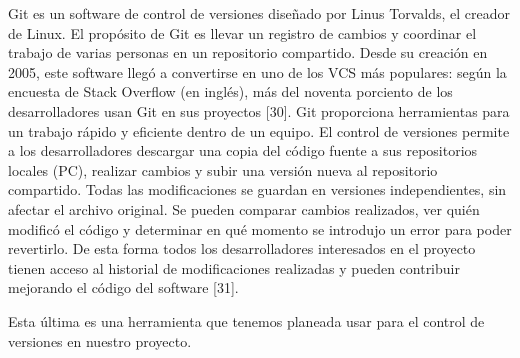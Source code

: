 \begin{list}{}%
    {\setlength{\leftmargin}{1cm}\setlength{\rightmargin}{1cm}}
    \item\relax
    \small

Git es un software de control de versiones diseñado por Linus Torvalds, el creador de Linux. El propósito de Git es llevar un registro de cambios y coordinar el trabajo de varias personas en un repositorio compartido. Desde su creación en 2005, este software llegó a convertirse en uno de los VCS más populares: según la encuesta de Stack Overflow (en inglés), más del noventa porciento de los desarrolladores usan Git en sus proyectos [30].
Git proporciona herramientas para un trabajo rápido y eficiente dentro de un equipo. El control de versiones permite a los desarrolladores descargar una copia del código fuente a sus repositorios locales (PC), realizar cambios y subir una versión nueva al repositorio compartido. Todas las modificaciones se guardan en versiones independientes, sin afectar el archivo original. Se pueden comparar cambios realizados, ver quién modificó el código y determinar en qué momento se introdujo un error para poder revertirlo. De esta forma todos los desarrolladores interesados en el proyecto tienen acceso al historial de modificaciones realizadas y pueden contribuir mejorando el código del software [31].

\end{list}

Esta última es una herramienta que tenemos planeada usar para el control de versiones en nuestro proyecto. 

